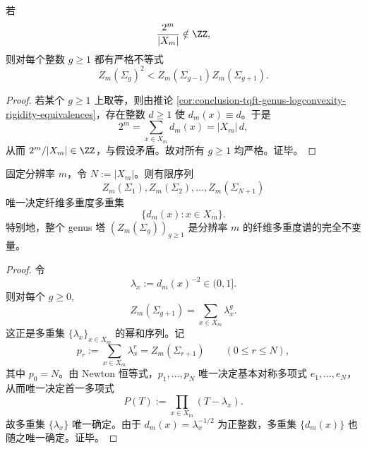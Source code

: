 \begin{corollary}[非整平均多重度强迫严格对数凸]\label{cor:conclusion-tqft-genus-strict-logconvexity-nonintegral-average}
若
\[
\frac{2^m}{|X_m|}\notin\ZZ,
\]
则对每个整数 \(g\ge 1\) 都有严格不等式
\[
Z_m(\Sigma_g)^2<Z_m(\Sigma_{g-1})Z_m(\Sigma_{g+1}).
\]
\end{corollary}
\begin{proof}
若某个 \(g\ge 1\) 上取等，则由推论 \ref{cor:conclusion-tqft-genus-logconvexity-rigidity-equivalences}，存在整数 \(d\ge 1\) 使 \(d_m(x)\equiv d\)。于是
\[
2^m=\sum_{x\in X_m}d_m(x)=|X_m|\,d,
\]
从而 \(2^m/|X_m|\in\ZZ\)，与假设矛盾。故对所有 \(g\ge 1\) 均严格。证毕。
\end{proof}

\begin{theorem}\label{thm:conclusion-tqft-genus-tower-complete-multiplicity-invariant}
固定分辨率 \(m\)，令 \(N:=|X_m|\)。则有限序列
\[
Z_m(\Sigma_1),Z_m(\Sigma_2),\dots,Z_m(\Sigma_{N+1})
\]
唯一决定纤维多重度多重集
\[
\{d_m(x):x\in X_m\}.
\]
特别地，整个 genus 塔 \((Z_m(\Sigma_g))_{g\ge 1}\) 是分辨率 \(m\) 的纤维多重度谱的完全不变量。
\end{theorem}
\begin{proof}
令
\[
\lambda_x:=d_m(x)^{-2}\in(0,1].
\]
则对每个 \(g\ge 0\),
\[
Z_m(\Sigma_{g+1})=\sum_{x\in X_m}\lambda_x^g.
\]
这正是多重集 \(\{\lambda_x\}_{x\in X_m}\) 的幂和序列。记
\[
p_r:=\sum_{x\in X_m}\lambda_x^r=Z_m(\Sigma_{r+1})
\qquad(0\le r\le N),
\]
其中 \(p_0=N\)。由 Newton 恒等式，\(p_1,\dots,p_N\) 唯一决定基本对称多项式 \(e_1,\dots,e_N\)，从而唯一决定首一多项式
\[
P(T):=\prod_{x\in X_m}(T-\lambda_x).
\]
故多重集 \(\{\lambda_x\}\) 唯一确定。由于 \(d_m(x)=\lambda_x^{-1/2}\) 为正整数，多重集 \(\{d_m(x)\}\) 也随之唯一确定。证毕。
\end{proof}

